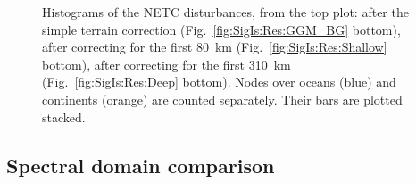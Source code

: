 \begin{figure}
    \begin{adjustbox}{center}
    \end{adjustbox}
    \caption[Histograms of the NETC disturbances, including the first \num{80} and \SI{310}{\kilo \metre} corrections.]{
        Histograms of the NETC disturbances, from the top plot: after the simple terrain correction (Fig.~\ref{fig:SigIs:Res:GGM_BG} bottom), after correcting for the first \SI{80}{\kilo \metre} (Fig.~\ref{fig:SigIs:Res:Shallow} bottom), after correcting for the first \SI{310}{\kilo \metre} (Fig.~\ref{fig:SigIs:Res:Deep} bottom).
        Nodes over oceans (blue) and continents (orange) are counted separately. Their bars are plotted stacked.
    }
    \label{fig:SigIs:Res:HistBGs}
\end{figure}

\FloatBarrier

\subsection{Spectral domain comparison}
\label{ss:SigIs:Results:Spectral}






